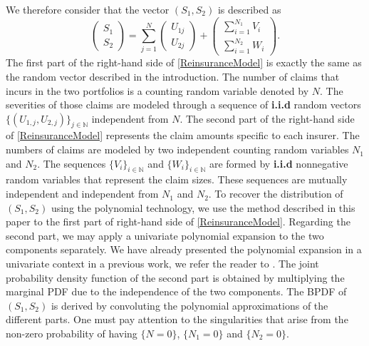 We therefore consider that the vector $(S_{1},S_{2})$ is described as 
\begin{equation}\label{ReinsuranceModel}
\left( \begin{array}{l}
S_1 \\
S_2 \end{array}
\right)  =
 \displaystyle\sum_{j=1}^{N}
\left( \begin{array}{l}
U_{1j} \\
U_{2j} \end{array}
\right)
+
\displaystyle
\left( \begin{array}{l}
\sum_{i=1}^{N_{1}}V_{i} \\
\sum_{i=1}^{N_{2}}W_{i} \end{array}
\right).
\end{equation}
The first part of the right-hand side of \ref{ReinsuranceModel} is exactly the same as the random vector described in the introduction. The number of claims that incurs in the two portfolios is a counting random variable denoted by $N$. The severities of those claims are modeled through a sequence of \textbf{i.i.d} random vectors $\{(U_{1,j},U_{2,j})\}_{j\in\mathbb{N}}$ independent from $N$. The second part of the right-hand side of \ref{ReinsuranceModel} represents the claim amounts specific to each insurer. The numbers of claims are modeled by two independent counting random variables $N_{1}$ and $N_{2}$. The sequences $\{V_{i}\}_{i\in\mathbb{N}}$ and $\{W_{i}\}_{i\in\mathbb{N}}$ are formed by \textbf{i.i.d} nonnegative random variables that represent the claim sizes. These sequences are mutually independent and independent from $N_{1}$ and $N_{2}$. To recover the distribution of $(S_{1},S_{2})$ using the polynomial technology, we use the method described in this paper to the first part of right-hand side of \ref{ReinsuranceModel}. Regarding the second part, we may apply a univariate polynomial expansion to the two components separately. We have already presented the polynomial expansion in a univariate context in a previous work, we refer the reader to \citet{GoLoPo2014}. The joint probability density function of the second part is obtained by multiplying the marginal PDF due to the independence of the two components. The BPDF of $(S_{1},S_{2})$ is derived by convoluting the polynomial approximations of the different parts. One must pay attention to the singularities that arise from the non-zero probability of having $\{N=0\}$, $\{N_{1}=0\}$ and $\{N_{2}=0\}$.\\

